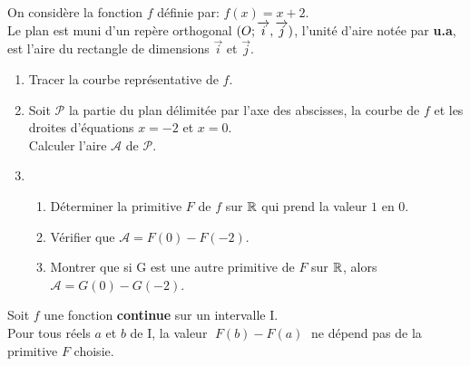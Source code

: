 \begin{lemma}
 On considère la fonction $f$ définie par: $f (x)=x+2 $.\\
Le plan est muni d'un repère orthogonal  $ (O ;\overrightarrow{i},\overrightarrow{j}) $, \; l'unité d'aire notée par \textbf{u.a},\;  est l'aire du rectangle de dimensions     $\overrightarrow{i}$  et  $\overrightarrow{j}$.
 \begin{enumerate}
 \item Tracer la courbe représentative de $f$.
 \item Soit $\mathscr{P}$ la partie du plan délimitée par l'axe des abscisses, la courbe de $f$ et les droites d'équations $ x=-2$ et $x=0 $.\\Calculer l'aire $\mathscr{A}$ de $\mathscr{P}$.
 \item 
 \begin{enumerate}
 \item Déterminer la primitive $F$ de $f$  sur  $ \mathbb{R} $ qui prend la valeur $1$ en $0$.
 \item Vérifier que $\mathscr{A}=F(0)- F (-2) $.
 \item Montrer que si G est une autre primitive de $F$ sur $  \mathbb{R} $,\; alors $\mathscr{A}=G(0)- G(-2) $.  
 \end{enumerate}
 \end{enumerate}
 
\end{lemma}
Soit $f$ une fonction \textbf{continue} sur un intervalle I.\\Pour tous réels $a$ et $b$   de I, la valeur  $\; F(b) -F(a)\; $ ne dépend pas de la primitive $F$ choisie.
